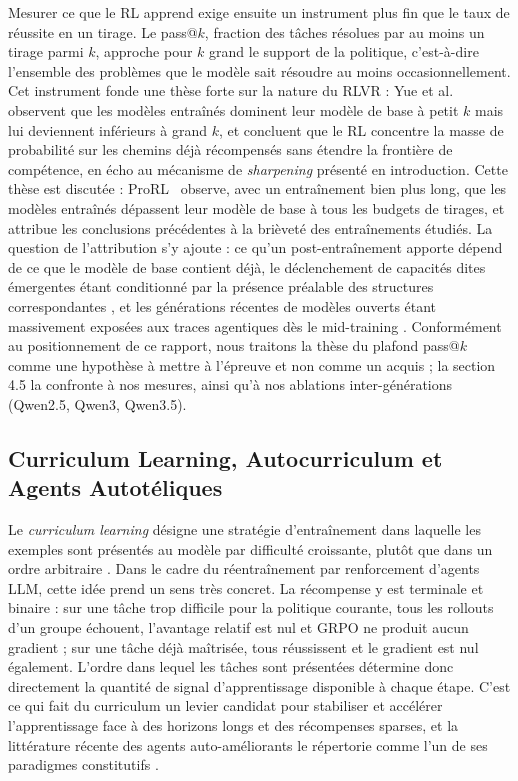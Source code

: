 \documentclass[11pt,a4paper]{article}
\begin{document}
Mesurer ce que le RL apprend exige ensuite un instrument plus fin que le taux de réussite en un tirage. Le pass@$k$, fraction des tâches résolues par au moins un tirage parmi $k$, approche pour $k$ grand le support de la politique, c'est-à-dire l'ensemble des problèmes que le modèle sait résoudre au moins occasionnellement. Cet instrument fonde une thèse forte sur la nature du RLVR : Yue et al. \cite{yue2025rlvr} observent que les modèles entraînés dominent leur modèle de base à petit $k$ mais lui deviennent inférieurs à grand $k$, et concluent que le RL concentre la masse de probabilité sur les chemins déjà récompensés sans étendre la frontière de compétence, en écho au mécanisme de \emph{sharpening} \cite{huang2024self} présenté en introduction. Cette thèse est discutée : ProRL~\cite{liu2025prorl} observe, avec un entraînement bien plus long, que les modèles entraînés dépassent leur modèle de base à tous les budgets de tirages, et attribue les conclusions précédentes à la brièveté des entraînements étudiés.
 La question de l'attribution s'y ajoute : ce qu'un post-entraînement apporte dépend de ce que le modèle de base contient déjà, le déclenchement de capacités dites émergentes étant conditionné par la présence préalable des structures correspondantes \cite{liu2025drgrpo}, et les générations récentes de modèles ouverts étant massivement exposées aux traces agentiques dès le mid-training \cite{qwen3coder2025, kimik2_2025}. Conformément au positionnement de ce rapport, nous traitons la thèse du plafond pass@$k$ comme une hypothèse à mettre à l'épreuve et non comme un acquis ; la section 4.5 la confronte à nos mesures, ainsi qu'à nos ablations inter-générations (Qwen2.5, Qwen3, Qwen3.5).

\subsection{Curriculum Learning, Autocurriculum et Agents Autotéliques}


Le \emph{curriculum learning} désigne une stratégie d'entraînement dans laquelle les exemples sont présentés au modèle par difficulté croissante, plutôt que dans un ordre arbitraire \cite{bengio2009curriculum}. Dans le cadre du réentraînement par renforcement d'agents LLM, cette idée prend un sens très concret. La récompense y est terminale et binaire : sur une tâche trop difficile pour la politique courante, tous les rollouts d'un groupe échouent, l'avantage relatif est nul et GRPO ne produit aucun gradient ; sur une tâche déjà maîtrisée, tous réussissent et le gradient est nul également. L'ordre dans lequel les tâches sont présentées détermine donc directement la quantité de signal d'apprentissage disponible à chaque étape. C'est ce qui fait du curriculum un levier candidat pour stabiliser et accélérer l'apprentissage face à des horizons longs et des récompenses sparses, et la littérature récente des agents auto-améliorants le répertorie comme l'un de ses paradigmes constitutifs \cite{gao2025selfevolving}.
\end{document}

